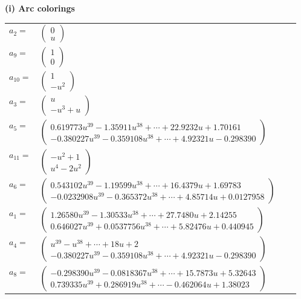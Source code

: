 \documentclass[1p]{elsarticle_modified}
\theoremstyle{definition}
\begin{document}
\flushleft \textbf{(i) Arc colorings}\\
\begin{tabular}{m{7pt} m{180pt} m{7pt} m{180pt} }
\flushright $a_{2}=$&$\begin{pmatrix}0\\u\end{pmatrix}$ \\
\flushright $a_{9}=$&$\begin{pmatrix}1\\0\end{pmatrix}$ \\
\flushright $a_{10}=$&$\begin{pmatrix}1\\- u^2\end{pmatrix}$ \\
\flushright $a_{3}=$&$\begin{pmatrix}u\\- u^3+u\end{pmatrix}$ \\
\flushright $a_{5}=$&$\begin{pmatrix}0.619773 u^{39}-1.35911 u^{38}+\cdots+22.9232 u+1.70161\\-0.380227 u^{39}-0.359108 u^{38}+\cdots+4.92321 u-0.298390\end{pmatrix}$ \\
\flushright $a_{11}=$&$\begin{pmatrix}- u^2+1\\u^4-2 u^2\end{pmatrix}$ \\
\flushright $a_{6}=$&$\begin{pmatrix}0.543102 u^{39}-1.19599 u^{38}+\cdots+16.4379 u+1.69783\\-0.0232908 u^{39}-0.365372 u^{38}+\cdots+4.85714 u+0.0127958\end{pmatrix}$ \\
\flushright $a_{1}=$&$\begin{pmatrix}1.26580 u^{39}-1.30533 u^{38}+\cdots+27.7480 u+2.14255\\0.646027 u^{39}+0.0537756 u^{38}+\cdots+5.82476 u+0.440945\end{pmatrix}$ \\
\flushright $a_{4}=$&$\begin{pmatrix}u^{39}- u^{38}+\cdots+18 u+2\\-0.380227 u^{39}-0.359108 u^{38}+\cdots+4.92321 u-0.298390\end{pmatrix}$ \\
\flushright $a_{8}=$&$\begin{pmatrix}-0.298390 u^{39}-0.0818367 u^{38}+\cdots+15.7873 u+5.32643\\0.739335 u^{39}+0.286919 u^{38}+\cdots-0.462064 u+1.38023\end{pmatrix}$ \\

\end{tabular}
\end{document}

